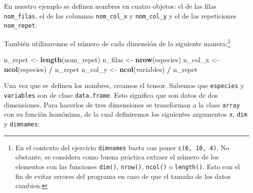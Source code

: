 \documentclass[
  spanish,
]{article}
\newenvironment{Shaded}{\begin{snugshade}}{\end{snugshade}}
\newcommand{\CommentTok}[1]{\textcolor[rgb]{0.56,0.35,0.01}{\textit{#1}}}
\newcommand{\DecValTok}[1]{\textcolor[rgb]{0.00,0.00,0.81}{#1}}
\newcommand{\KeywordTok}[1]{\textcolor[rgb]{0.13,0.29,0.53}{\textbf{#1}}}
\newcommand{\NormalTok}[1]{#1}
\newcommand{\OperatorTok}[1]{\textcolor[rgb]{0.81,0.36,0.00}{\textbf{#1}}}
\newcommand{\StringTok}[1]{\textcolor[rgb]{0.31,0.60,0.02}{#1}}
\begin{document}
En nuestro ejemplo se definen nombres en cuatro objetos: el de las filas \texttt{nom\_filas}, el de las columnas \texttt{nom\_col\_x} y \texttt{nom\_col\_y} y el de las repeticiones \texttt{nom\_repet}:

\begin{Shaded}
\end{Shaded}

También utilizaremos el número de cada dimensión de la siguiente manera:\footnote{En el contexto del ejercicio \texttt{dimnames} basta con poner \texttt{c(6,\ 10,\ 4)}. No obstante, se considera como buena práctica extraer el número de los elementos con las funciones \texttt{dim()}, \texttt{nrow()}, \texttt{ncol()} o \texttt{length()}. Esto con el fin de evitar errores del programa en caso de que el tamaño de los datos cambien.}

\begin{Shaded}
\begin{Highlighting}[]
\NormalTok{n\_repet \textless{}{-}}\StringTok{ }\KeywordTok{length}\NormalTok{(nom\_repet)}
\NormalTok{n\_filas \textless{}{-}}\StringTok{ }\KeywordTok{nrow}\NormalTok{(especies)}
\NormalTok{n\_col\_x \textless{}{-}}\StringTok{ }\KeywordTok{ncol}\NormalTok{(especies)  }\OperatorTok{/}\StringTok{ }\NormalTok{n\_repet}
\NormalTok{n\_col\_y \textless{}{-}}\StringTok{ }\KeywordTok{ncol}\NormalTok{(variables) }\OperatorTok{/}\StringTok{ }\NormalTok{n\_repet}
\end{Highlighting}
\end{Shaded}

Una vez que se definen los nombres, creamos el tensor. Sabemos que \texttt{especies} y \texttt{variables} son de clase \texttt{data.frame}. Esto significa que son datos de dos dimensiones. Para hacerlos de tres dimensiones se transforman a la clase \texttt{array} con su función homónima, de la cual definiremos los siguientes argumentos \texttt{x}, \texttt{dim} y \texttt{dimnames}:
\end{document}
